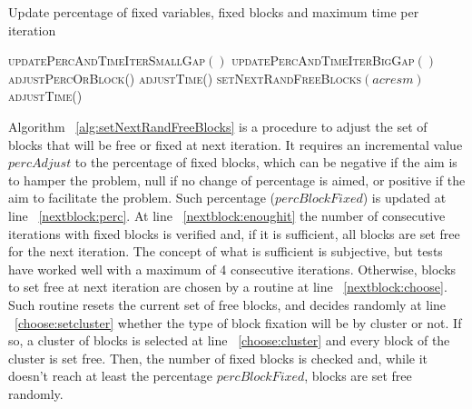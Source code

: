 \begin{algorithm}[H]
  \caption{Update percentage of fixed variables, fixed blocks and maximum time per iteration
    \label{alg:updatePercAndTimeIter}}
  \begin{algorithmic}[1]
																									\label{update:allfree}
				\Return
			\EndIf
			  \State \textsc{updatePercAndTimeIterSmallGap}$()$									\label{update:smallgap}
			\Else
				\State \textsc{updatePercAndTimeIterBigGap}$()$										\label{update:biggap}
			\EndIf
    \EndProcedure	
		\Statex
																\label{alg:smallgap}
				\State \textsc{adjustPercOrBlock}()																\label{smallgap:percblock}
				\State \textsc{adjustTime}()																			\label{smallgap:time}
			\EndProcedure
		\Statex
																				\label{alg:biggap}
													\label{biggap:noimprove}
					\State \textsc{setNextRandFreeBlocks}$(acresm)$												\label{biggap:nextblock}
					\State \textsc{adjustTime}()																					\label{biggap:time}
				\EndIf
			\EndProcedure			
  \end{algorithmic}	
\end{algorithm}


Algorithm ~\ref{alg:setNextRandFreeBlocks} is a procedure to adjust the set of blocks that will be free or fixed at next iteration. It requires an incremental value $percAdjust$ to the percentage of fixed blocks, which can be negative if the aim is to hamper the problem, null if no change of percentage is aimed, or positive if the aim to facilitate the problem. Such percentage ($percBlockFixed$) is updated at line ~\ref{nextblock:perc}. At line ~\ref{nextblock:enoughit} the number of consecutive iterations with fixed blocks is verified and, if it is sufficient, all blocks are set free for the next iteration. The concept of what is sufficient is subjective, but tests have worked well with a maximum of 4 consecutive iterations. Otherwise, blocks to set free at next iteration are chosen by a routine at line ~\ref{nextblock:choose}. Such routine resets the current set of free blocks, and decides randomly at line ~\ref{choose:setcluster} whether the type of block fixation will be by cluster or not. If so, a cluster of blocks is selected at line ~\ref{choose:cluster} and every block of the cluster is set free. Then, the number of fixed blocks is checked and, while it doesn't reach at least the percentage $percBlockFixed$, blocks are set free randomly.

